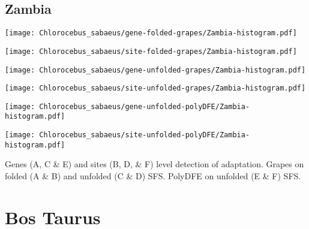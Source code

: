 \documentclass{article}
\begin{document}
\subsection{Zambia}
\centering
\begin{minipage}{0.49\linewidth}
    \texttt{[image: Chlorocebus\_sabaeus/gene-folded-grapes/Zambia-histogram.pdf]}
\end{minipage}%
\hfill
\begin{minipage}{0.49\linewidth}
    \texttt{[image: Chlorocebus\_sabaeus/site-folded-grapes/Zambia-histogram.pdf]}
\end{minipage}
\hfill
\begin{minipage}{0.49\linewidth}
    \texttt{[image: Chlorocebus\_sabaeus/gene-unfolded-grapes/Zambia-histogram.pdf]}
\end{minipage}%
\hfill
\begin{minipage}{0.49\linewidth}
    \texttt{[image: Chlorocebus\_sabaeus/site-unfolded-grapes/Zambia-histogram.pdf]}
\end{minipage}
\hfill
\begin{minipage}{0.49\linewidth}
    \texttt{[image: Chlorocebus\_sabaeus/gene-unfolded-polyDFE/Zambia-histogram.pdf]}
\end{minipage}%
\hfill
\begin{minipage}{0.49\linewidth}
    \texttt{[image: Chlorocebus\_sabaeus/site-unfolded-polyDFE/Zambia-histogram.pdf]}
\end{minipage}
\hfill
\flushleft
Genes (A, C \& E) and sites (B, D, \& F) level detection of adaptation.
Grapes on folded (A \& B) and unfolded (C \& D) SFS.
PolyDFE on unfolded (E \& F) SFS.

\pagebreak
\section{Bos Taurus}
\end{document}
